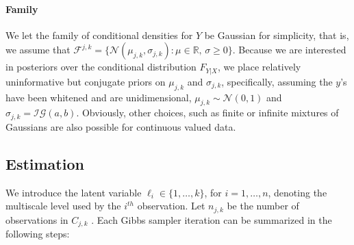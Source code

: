 \documentclass{article} %
\newcommand{\Real}{\mathbb{R}}
\providecommand{\mc}[1]{\mathcal{#1}}
\newcommand{\dd}[1]{{\color{blue}{\it #1}}}
\begin{document}
\paragraph{Family} We let the family of conditional densities for $Y$ be Gaussian for simplicity, that is, we assume that $\mc{F}^{j,k}=\{\mc{N}(\mu_{j,k}, {\sigma}_{j,k}) : \mu \in \Real, \, \sigma \geq 0\}$. Because we are interested in posteriors over the conditional distribution $F_{Y|X}$, we place relatively uninformative but conjugate priors on $\mu_{j,k}$ and ${\sigma}_{j,k}$, specifically, assuming the $y$'s have been whitened and are unidimensional,  
${\mu}_{j,k} \sim \mc{N}(0,1)$ and ${\sigma}_{j,k}=\mc{IG}(a,b)$.  
Obviously, other choices, such as finite or infinite mixtures of Gaussians are also possible for continuous valued data.  




\subsection{Estimation}



We introduce the latent variable $\ell_i \in \{1,\ldots,k\}$, for $i=1,\ldots,n$, denoting the multiscale level used by the $i^{th}$ observation.  
Let $n_{j,k}$ be  the number of observations in $C_{j,k}$ . Each Gibbs sampler iteration can be summarized in the following steps:
\dd{francy: i changed the notation a bit to be consistent with previous literature. can you check to make sure i didn't screw anything up?}
\end{document}

